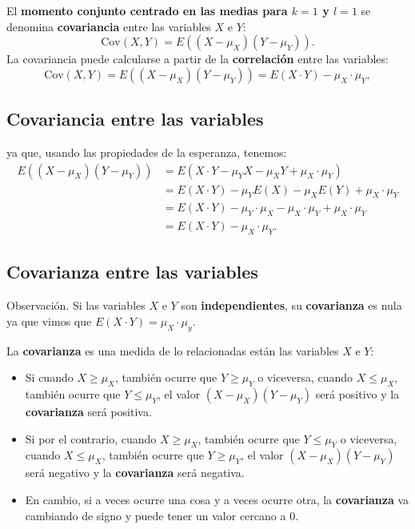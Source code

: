 \documentclass[]{book}
\begin{document}
El \textbf{momento conjunto centrado en las medias para \(k=1\) y \(l=1\)} se denomina \textbf{covariancia} entre las variables \(X\) e \(Y\):
\[
\mathrm{Cov}(X,Y)=E((X-\mu_X)(Y-\mu_Y)).
\]
La covariancia puede calcularse a partir de la \textbf{correlación} entre las variables:
\[
\mathrm{Cov}(X,Y)=E((X-\mu_X)(Y-\mu_Y))=E(X\cdot Y)-\mu_X\cdot \mu_Y,
\]

\hypertarget{covariancia-entre-las-variables-1}{%
\subsection{Covariancia entre las variables}\label{covariancia-entre-las-variables-1}}

ya que, usando las propiedades de la esperanza, tenemos:
\[
\begin{array}{rl}
E((X-\mu_X)(Y-\mu_Y)) & =E(X\cdot Y-\mu_Y X-\mu_X Y+\mu_X\cdot \mu_Y)\\ & =E(X\cdot Y)-\mu_YE(X)-\mu_X E(Y)+\mu_X\cdot \mu_Y \\ &  = E(X\cdot Y)-\mu_Y\cdot \mu_X-\mu_X \cdot \mu_Y+\mu_X\cdot \mu_Y \\ & = E(X\cdot Y)-\mu_X\cdot \mu_Y.
\end{array}
\]

\hypertarget{covarianza-entre-las-variables}{%
\subsection{Covarianza entre las variables}\label{covarianza-entre-las-variables}}

Observación.
Si las variables \(X\) e \(Y\) son \textbf{independientes}, su \textbf{covarianza} es nula ya que vimos que \(E(X\cdot Y)=\mu_X\cdot \mu_y\).

La \textbf{covarianza} es una medida de lo relacionadas están las variables \(X\) e \(Y\):

\begin{itemize}
\item
  Si cuando \(X\geq \mu_X\), también ocurre que \(Y\geq \mu_Y\) o viceversa, cuando \(X\leq \mu_X\), también ocurre que \(Y\leq \mu_Y\), el valor \((X-\mu_X)(Y-\mu_Y)\) será positivo y la \textbf{covarianza} será positiva.
\item
  Si por el contrario, cuando \(X\geq \mu_X\), también ocurre que \(Y\leq \mu_Y\) o viceversa, cuando \(X\leq \mu_X\), también ocurre que \(Y\geq \mu_Y\), el valor \((X-\mu_X)(Y-\mu_Y)\) será negativo y la \textbf{covarianza} será negativa.
\item
  En cambio, si a veces ocurre una cosa y a veces ocurre otra, la \textbf{covarianza} va cambiando de signo y puede tener un valor cercano a 0.
\end{itemize}
\end{document}
